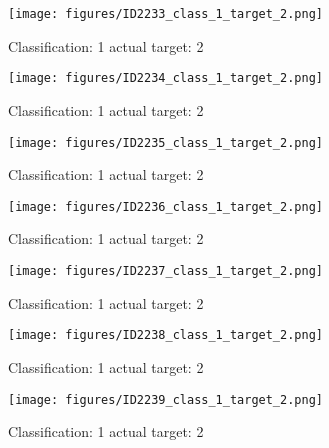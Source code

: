 \begin{figure}[h!]
\begin{center}
\texttt{[image: figures/ID2233\_class\_1\_target\_2.png]}
\end{center}
\caption{ Classification: 1 actual target: 2}
\label{fig:ID2233_class_1_target_2}
\end{figure}
\begin{figure}[h!]
\begin{center}
\texttt{[image: figures/ID2234\_class\_1\_target\_2.png]}
\end{center}
\caption{ Classification: 1 actual target: 2}
\label{fig:ID2234_class_1_target_2}
\end{figure}
\begin{figure}[h!]
\begin{center}
\texttt{[image: figures/ID2235\_class\_1\_target\_2.png]}
\end{center}
\caption{ Classification: 1 actual target: 2}
\label{fig:ID2235_class_1_target_2}
\end{figure}
\begin{figure}[h!]
\begin{center}
\texttt{[image: figures/ID2236\_class\_1\_target\_2.png]}
\end{center}
\caption{ Classification: 1 actual target: 2}
\label{fig:ID2236_class_1_target_2}
\end{figure}
\begin{figure}[h!]
\begin{center}
\texttt{[image: figures/ID2237\_class\_1\_target\_2.png]}
\end{center}
\caption{ Classification: 1 actual target: 2}
\label{fig:ID2237_class_1_target_2}
\end{figure}
\begin{figure}[h!]
\begin{center}
\texttt{[image: figures/ID2238\_class\_1\_target\_2.png]}
\end{center}
\caption{ Classification: 1 actual target: 2}
\label{fig:ID2238_class_1_target_2}
\end{figure}
\begin{figure}[h!]
\begin{center}
\texttt{[image: figures/ID2239\_class\_1\_target\_2.png]}
\end{center}
\caption{ Classification: 1 actual target: 2}
\label{fig:ID2239_class_1_target_2}
\end{figure}
